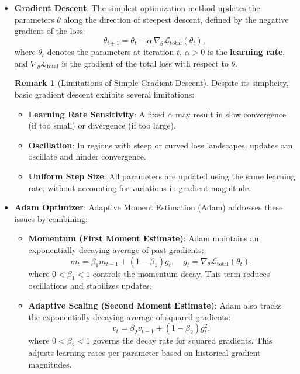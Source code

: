 \documentclass[12pt,a4paper]{article}
\theoremstyle{definition}
\newtheorem{remark}{Remark}[subsection]
\begin{document}
\begin{itemize}

    \item \textbf{Gradient Descent}: The simplest optimization method updates the parameters $\theta$ along the direction of steepest descent, defined by the negative gradient of the loss:
    \[
    \theta_{t+1} = \theta_t - \alpha \, \nabla_\theta \mathcal{L}_{\text{total}}(\theta_t),
    \]
    where $\theta_t$ denotes the parameters at iteration $t$, $\alpha > 0$ is the \textbf{learning rate}, and $\nabla_\theta \mathcal{L}_{\text{total}}$ is the gradient of the total loss with respect to $\theta$.

    \begin{remark}[Limitations of Simple Gradient Descent]
    Despite its simplicity, basic gradient descent exhibits several limitations:
    \begin{itemize}
        \item \textbf{Learning Rate Sensitivity}: A fixed $\alpha$ may result in slow convergence (if too small) or divergence (if too large).
        \item \textbf{Oscillation}: In regions with steep or curved loss landscapes, updates can oscillate and hinder convergence.
        \item \textbf{Uniform Step Size}: All parameters are updated using the same learning rate, without accounting for variations in gradient magnitude.
    \end{itemize}
    \end{remark}

    \item \textbf{Adam Optimizer}: Adaptive Moment Estimation (Adam) addresses these issues by combining:
    \begin{itemize}
        \item \textbf{Momentum (First Moment Estimate)}: Adam maintains an exponentially decaying average of past gradients:
        \[
        m_t = \beta_1 m_{t-1} + (1 - \beta_1) g_t, \quad g_t = \nabla_\theta \mathcal{L}_{\text{total}}(\theta_t),
        \]
        where $0 < \beta_1 < 1$ controls the momentum decay. This term reduces oscillations and stabilizes updates.

        \item \textbf{Adaptive Scaling (Second Moment Estimate)}: Adam also tracks the exponentially decaying average of squared gradients:
        \[
        v_t = \beta_2 v_{t-1} + (1 - \beta_2) g_t^2,
        \]
        where $0 < \beta_2 < 1$ governs the decay rate for squared gradients. This adjusts learning rates per parameter based on historical gradient magnitudes.


\end{itemize}
\end{itemize}
\end{document}
